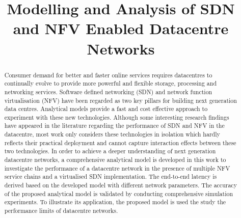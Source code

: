 \documentclass[conference]{IEEEtran}
\begin{document}
\title{Modelling and Analysis of SDN and NFV Enabled Datacentre Networks}

\author{
}
 
\maketitle

\begin{abstract}
Consumer demand for better and faster online services requires datacentres to continually evolve to provide more powerful and flexible storage, processing and networking services. Software defined networking (SDN) and network function virtualisation (NFV) have been regarded as two key pillars for building next generation data centres. Analytical models provide a fast and cost effective approach to experiment with these new technologies. Although some interesting research findings have appeared in the literature regarding the performance of SDN and NFV in the datacentre, most work only considers these technologies in isolation which hardly reflects their practical deployment and cannot capture interaction effects between these two technologies. In order to achieve a deeper understanding of next generation datacentre networks, a comprehensive analytical model is developed in this work to investigate the performance of a datacentre network in the presence of multiple NFV service chains and a virtualised SDN implementation. The end-to-end latency is derived based on the developed model with different network parameters. The accuracy of the proposed analytical model is validated by conducting comprehensive simulation experiments. To illustrate its application, the proposed model is used the study the performance limits of datacentre networks.
\end{abstract}
















\end{document}
